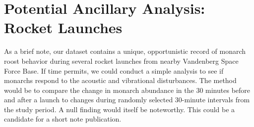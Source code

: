 \section{Potential Ancillary Analysis: Rocket Launches}

As a brief note, our dataset contains a unique, opportunistic record of monarch roost behavior during several rocket launches from nearby Vandenberg Space Force Base. If time permits, we could conduct a simple analysis to see if monarchs respond to the acoustic and vibrational disturbances. The method would be to compare the change in monarch abundance in the 30 minutes before and after a launch to changes during randomly selected 30-minute intervals from the study period. A null finding would itself be noteworthy. This could be a candidate for a short note publication.
